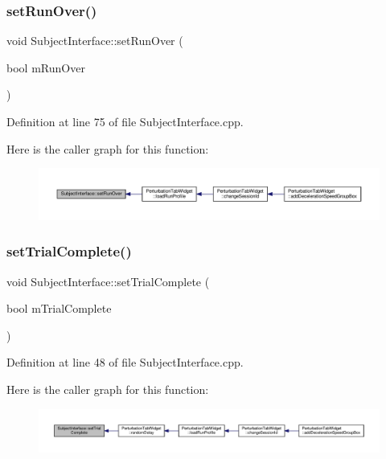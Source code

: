 \subsubsection{\texorpdfstring{set\+Run\+Over()}{setRunOver()}}
{\footnotesize\ttfamily void Subject\+Interface\+::set\+Run\+Over (\begin{DoxyParamCaption}\item[{bool}]{m\+Run\+Over }\end{DoxyParamCaption})}



Definition at line 75 of file Subject\+Interface.\+cpp.

Here is the caller graph for this function\+:
\nopagebreak
\begin{figure}[H]
\begin{center}
\leavevmode
\includegraphics[width=350pt]{class_subject_interface_ae3758be4462ddf57f8f97acfc1d17538_icgraph}
\end{center}
\end{figure}
\mbox{\label{class_subject_interface_a8745c1479558aba371ce0b984337c588}} 
\subsubsection{\texorpdfstring{set\+Trial\+Complete()}{setTrialComplete()}}
{\footnotesize\ttfamily void Subject\+Interface\+::set\+Trial\+Complete (\begin{DoxyParamCaption}\item[{bool}]{m\+Trial\+Complete }\end{DoxyParamCaption})}



Definition at line 48 of file Subject\+Interface.\+cpp.

Here is the caller graph for this function\+:
\nopagebreak
\begin{figure}[H]
\begin{center}
\leavevmode
\includegraphics[width=350pt]{class_subject_interface_a8745c1479558aba371ce0b984337c588_icgraph}
\end{center}
\end{figure}
\mbox{\label{class_subject_interface_aab83bd19dd636c8902a3e04aa8851cd2}} 
